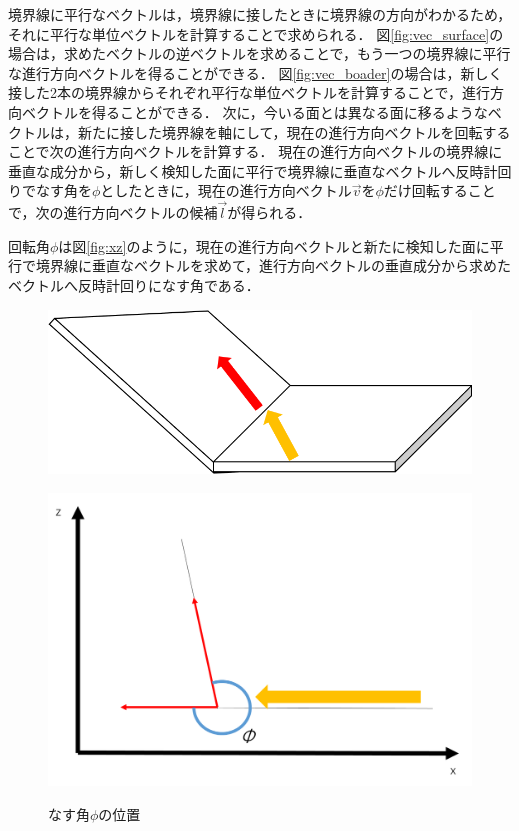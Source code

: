 \documentclass[a4paper,11pt]{jarticle}
\begin{document}
	境界線に平行なベクトルは，境界線に接したときに境界線の方向がわかるため，それに平行な単位ベクトルを計算することで求められる．
	図\ref{fig:vec_surface}の場合は，求めたベクトルの逆ベクトルを求めることで，もう一つの境界線に平行な進行方向ベクトルを得ることができる．
	図\ref{fig:vec_boader}の場合は，新しく接した2本の境界線からそれぞれ平行な単位ベクトルを計算することで，進行方向ベクトルを得ることができる．
	次に，今いる面とは異なる面に移るようなベクトルは，新たに接した境界線を軸にして，現在の進行方向ベクトルを回転することで次の進行方向ベクトルを計算する．
	現在の進行方向ベクトルの境界線に垂直な成分から，新しく検知した面に平行で境界線に垂直なベクトルへ反時計回りでなす角を$ \phi $としたときに，現在の進行方向ベクトル$\vec{v}$を$\phi$だけ回転することで，次の進行方向ベクトルの候補$\vec{l}$が得られる．
	
	回転角$\phi$は図\ref{fig:xz}のように，現在の進行方向ベクトルと新たに検知した面に平行で境界線に垂直なベクトルを求めて，進行方向ベクトルの垂直成分から求めたベクトルへ反時計回りになす角である．
	\begin{figure}
		\begin{minipage}{0.5\linewidth}
			\centering
			\includegraphics[width=1\linewidth]{png/sub.png}
			\label{fig:phi}
		\end{minipage}
		\begin{minipage}{0.5\linewidth}
			\centering
			\includegraphics[width=1\linewidth]{png/rotation.png}
			\label{fig:xz}
		\end{minipage}
		\caption{なす角$\phi$の位置}
		\label{fig:rotation}
	\end{figure}
\end{document}
